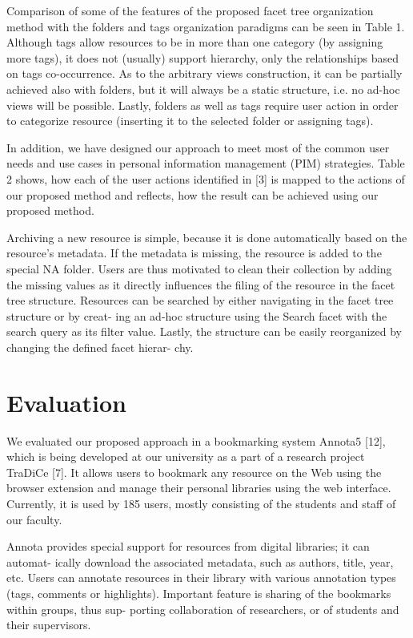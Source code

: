 \documentclass{llncs}
\begin{document}
Comparison of some of the features of the proposed facet tree organization method with the folders and tags organization paradigms can be seen in Table 1. Although tags allow resources to be in more than one category (by assigning more tags), it does not (usually) support hierarchy, only the relationships based on tags co-occurrence. As to the arbitrary views construction, it can be partially achieved also with folders, but it will always be a static structure, i.e. no ad-hoc views will be possible. Lastly, folders as well as tags require user action in order to categorize resource (inserting it to the selected folder or assigning tags).

In addition, we have designed our approach to meet most of the common user needs and use cases in personal information management (PIM) strategies. Table 2 shows, how each of the user actions identified in [3] is mapped to the actions of our proposed method and reflects, how the result can be achieved using our proposed method.

Archiving a new resource is simple, because it is done automatically based on the resource’s metadata. If the metadata is missing, the resource is added to the special NA folder. Users are thus motivated to clean their collection by adding the missing values as it directly influences the filing of the resource in the facet tree structure. Resources can be searched by either navigating in the facet tree structure or by creat- ing an ad-hoc structure using the Search facet with the search query as its filter value.
Lastly, the structure can be easily reorganized by changing the defined facet hierar- chy.

\section{Evaluation}

We evaluated our proposed approach in a bookmarking system Annota5 [12], which is being developed at our university as a part of a research project TraDiCe [7]. It allows users to bookmark any resource on the Web using the browser extension and manage their personal libraries using the web interface. Currently, it is used by 185 users, mostly consisting of the students and staff of our faculty.

Annota provides special support for resources from digital libraries; it can automat- ically download the associated metadata, such as authors, title, year, etc. Users can annotate resources in their library with various annotation types (tags, comments or highlights). Important feature is sharing of the bookmarks within groups, thus sup- porting collaboration of researchers, or of students and their supervisors.
\end{document}
